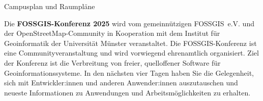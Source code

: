 \vspace*{\contentspace}%
\noindent Campusplan und Raumpläne \dotfill \pageref{kartenseiten}

\justifying

\vspace{0.2cm}
\noindent
Die {\bfseries FOSSGIS-Konferenz 2025} wird vom gemeinnützigen FOSSGIS~e.V. und der OpenStreetMap-Community in Kooperation mit
dem Institut für Geoinformatik der Universität Münster veranstaltet.  Die FOSSGIS-Konferenz ist eine Communityveranstaltung und wird vorwiegend ehrenamtlich organisiert. Ziel der Konferenz ist die Verbreitung von freier, quelloffener Software für Geoinformationssysteme. In den nächsten vier Tagen haben Sie
die Gelegenheit, sich mit Entwickler:innen und anderen Anwender:innen auszutauschen und neueste Informationen zu Anwendungen und Arbeitsmöglichkeiten zu erhalten.


\newpage
